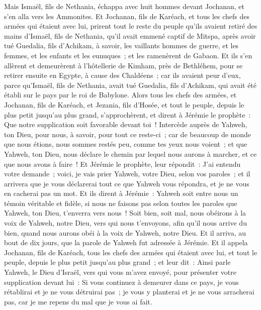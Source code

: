 \begin{multicols}{2}
Mais Ismaël, fils de Nethania, échappa avec huit hommes devant Jochanan, et s'en alla vers les Ammonites.
Et Jochanan, fils de Karéach, et tous les chefs des armées qui étaient avec lui, prirent tout le reste du peuple qu'ils avaient retiré des mains d'Ismaël, fils de Nethania, qu'il avait emmené captif de Mitspa, après avoir tué Guedalia, fils d'Achikam, à savoir, les vaillants hommes de guerre, et les femmes, et les enfants et les eunuques~; et les ramenèrent de Gabaon.
Et ils s'en allèrent et demeurèrent à l'hôtellerie de Kimham, près de Bethléhem, pour se retirer ensuite en Egypte,
à cause des Chaldéens~; car ils avaient peur d'eux, parce qu'Ismaël, fils de Nethania, avait tué Guedalia, fils d'Achikam, qui avait été établi sur le pays par le roi de Babylone.
\VerseOne{}Alors tous les chefs des armées, et Jochanan, fils de Karéach, et Jezania, fils d'Hosée, et tout le peuple, depuis le plus petit jusqu'au plus grand, s'approchèrent,
et dirent à Jérémie le prophète~: Que notre supplication soit favorable devant toi~! Intercède auprès de Yahweh, ton Dieu, pour nous, à savoir, pour tout ce reste-ci~; car de beaucoup de monde que nous étions, nous sommes restés peu, comme tes yeux nous voient~;
et que Yahweh, ton Dieu, nous déclare le chemin par lequel nous aurons à marcher, et ce que nous avons à faire~!
Et Jérémie le prophète, leur répondit~: J'ai entendu votre demande~; voici, je vais prier Yahweh, votre Dieu, selon vos paroles~; et il arrivera que je vous déclarerai tout ce que Yahweh vous répondra, et je ne vous en cacherai pas un mot.
Et ils dirent à Jérémie~: Yahweh soit entre nous un témoin véritable et fidèle, si nous ne faisons pas selon toutes les paroles que Yahweh, ton Dieu, t'enverra vers nous~!
Soit bien, soit mal, nous obéirons à la voix de Yahweh, notre Dieu, vers qui nous t'envoyons, afin qu'il nous arrive du bien, quand nous aurons obéi à la voix de Yahweh, notre Dieu.
Et il arriva, au bout de dix jours, que la parole de Yahweh fut adressée à Jérémie.
Et il appela Jochanan, fils de Karéach, tous les chefs des armées qui étaient avec lui, et tout le peuple, depuis le plus petit jusqu'au plus grand~;
et leur dit~: Ainsi parle Yahweh, le Dieu d'Israël, vers qui vous m'avez envoyé, pour présenter votre supplication devant lui~:
Si vous continuez à demeurer dans ce pays, je vous rétablirai et je ne vous détruirai pas~; je vous y planterai et je ne vous arracherai pas, car je me repens du mal que je vous ai fait.

\end{multicols}

